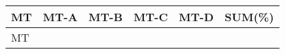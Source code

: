 \begin{table}[h]
\centering
\begin{tabular}{lccccr}
\hline
MT&MT-A&MT-B&MT-C&MT-D&SUM(\%)\\
\hline
{{MT}}
\hline
\end{tabular}
\end{table}
